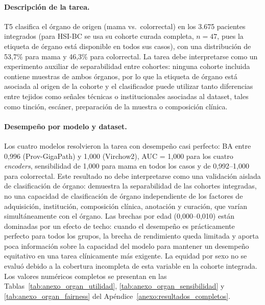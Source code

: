 \paragraph{Descripción de la tarea.} T5 clasifica el órgano de origen (mama vs.\ colorrectal) en los 3.675 pacientes integrados (para HSI-BC se usa su cohorte curada completa, $n=47$, pues la etiqueta de órgano está disponible en todos sus casos), con una distribución de 53,7\% para mama y 46,3\% para colorrectal. La tarea debe interpretarse como un experimento auxiliar de separabilidad entre cohortes: ninguna cohorte incluida contiene muestras de ambos órganos, por lo que la etiqueta de órgano está asociada al origen de la cohorte y el clasificador puede utilizar tanto diferencias entre tejidos como señales técnicas o institucionales asociadas al dataset, tales como tinción, escáner, preparación de la muestra o composición clínica.

\paragraph{Desempeño por modelo y dataset.} Los cuatro modelos resolvieron la tarea con desempeño casi perfecto: BA entre 0,996 (Prov-GigaPath) y 1,000 (Virchow2), AUC = 1,000 para los cuatro \textit{encoders}, sensibilidad de 1,000 para mama en todos los casos y de 0,992--1,000 para colorrectal. Este resultado no debe interpretarse como una validación aislada de clasificación de órgano: demuestra la separabilidad de las cohortes integradas, no una capacidad de clasificación de órgano independiente de los factores de adquisición, institución, composición clínica, anotación y curación, que varían simultáneamente con el órgano. Las brechas por edad (0,000--0,010) están dominadas por un efecto de techo: cuando el desempeño es prácticamente perfecto para todos los grupos, la brecha de rendimiento queda limitada y aporta poca información sobre la capacidad del modelo para mantener un desempeño equitativo en una tarea clínicamente más exigente. La equidad por sexo no se evaluó debido a la cobertura incompleta de esta variable en la cohorte integrada. Los valores numéricos completos se presentan en las Tablas~\ref{tab:anexo_organ_utilidad}, \ref{tab:anexo_organ_sensibilidad} y \ref{tab:anexo_organ_fairness} del Apéndice~\ref{anexo:resultados_completos}.

